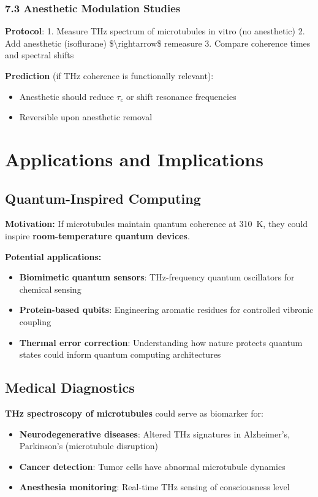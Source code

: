 \subsubsection{7.3 Anesthetic Modulation
Studies}\label{anesthetic-modulation-studies}

\textbf{Protocol}: 1. Measure THz spectrum of microtubules in vitro (no
anesthetic) 2. Add anesthetic (isoflurane) \$\textbackslash rightarrow\$
remeasure 3. Compare coherence times and spectral shifts

\textbf{Prediction} (if THz coherence is functionally relevant):
\begin{itemize}
\item Anesthetic should reduce $\tau_c$ or shift resonance frequencies
\item Reversible upon anesthetic removal
\end{itemize}

\section{Applications and Implications}

\subsection{Quantum-Inspired Computing}

\textbf{Motivation:} If microtubules maintain quantum coherence at 310~K, they could inspire \textbf{room-temperature quantum devices}.

\textbf{Potential applications:}
\begin{itemize}
\item \textbf{Biomimetic quantum sensors}: THz-frequency quantum oscillators for chemical sensing
\item \textbf{Protein-based qubits}: Engineering aromatic residues for controlled vibronic coupling
\item \textbf{Thermal error correction}: Understanding how nature protects quantum states could inform quantum computing architectures
\end{itemize}

\subsection{Medical Diagnostics}

\textbf{THz spectroscopy of microtubules} could serve as biomarker for:
\begin{itemize}
\item \textbf{Neurodegenerative diseases}: Altered THz signatures in Alzheimer's, Parkinson's (microtubule disruption)
\item \textbf{Cancer detection}: Tumor cells have abnormal microtubule dynamics
\item \textbf{Anesthesia monitoring}: Real-time THz sensing of consciousness level
\end{itemize}

